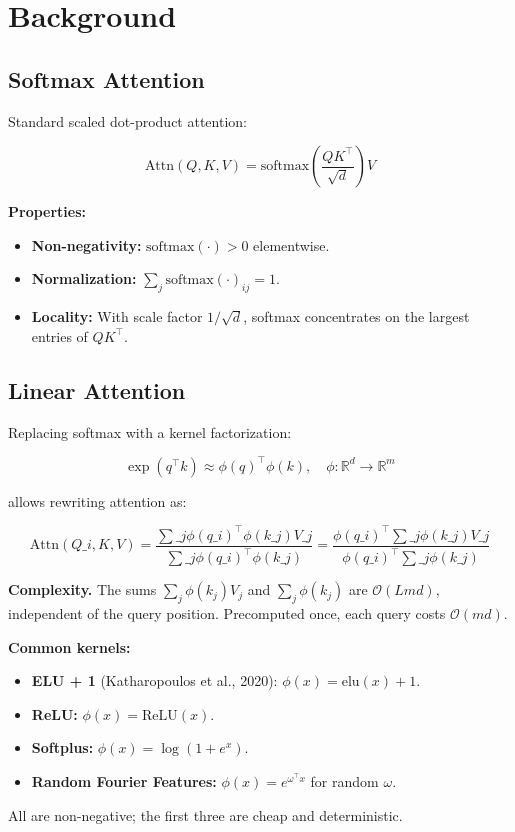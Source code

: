 
\section{Background}

\subsection{Softmax Attention}

Standard scaled dot-product attention:

\[
\text{Attn}(Q, K, V) = \text{softmax}\!\left(\frac{QK^\top}{\sqrt{d}}\right)V
\]

\textbf{Properties:}
\begin{itemize}
\item \textbf{Non-negativity:} $\text{softmax}(\cdot) > 0$ elementwise.
\item \textbf{Normalization:} $\sum_j \text{softmax}(\cdot)_{ij} = 1$.
\item \textbf{Locality:} With scale factor $1/\sqrt{d}$, softmax concentrates on
  the largest entries of $QK^\top$.

\end{itemize}
\subsection{Linear Attention}

Replacing softmax with a kernel factorization:

\[
\exp(q^\top k) \approx \phi(q)^\top \phi(k), \quad \phi: \mathbb{R}^d \to \mathbb{R}^m
\]

allows rewriting attention as:

\[
\text{Attn}(Q\_i, K, V) = \frac{\sum\_j \phi(q\_i)^\top \phi(k\_j) V\_j}{\sum\_j \phi(q\_i)^\top \phi(k\_j)} = \frac{\phi(q\_i)^\top \sum\_j \phi(k\_j) V\_j}{\phi(q\_i)^\top \sum\_j \phi(k\_j)}
\]

\textbf{Complexity.} The sums $\sum_j \phi(k_j) V_j$ and $\sum_j \phi(k_j)$ are 
$\mathcal{O}(L m d)$, independent of the query position. Precomputed once, 
each query costs $\mathcal{O}(m d)$.

\textbf{Common kernels:}
\begin{itemize}
\item \textbf{ELU + 1} (Katharopoulos et al., 2020): $\phi(x) = \text{elu}(x) + 1$.
\item \textbf{ReLU:} $\phi(x) = \text{ReLU}(x)$.
\item \textbf{Softplus:} $\phi(x) = \log(1 + e^x)$.
\item \textbf{Random Fourier Features:} $\phi(x) = e^{\omega^\top x}$ for random
  $\omega$.

\end{itemize}
All are non-negative; the first three are cheap and deterministic.

